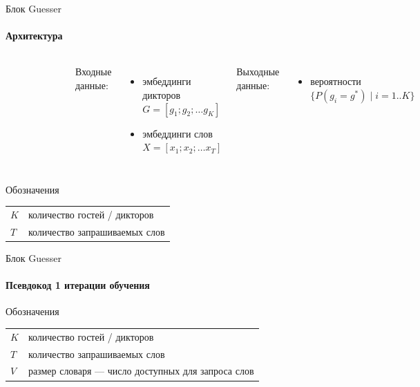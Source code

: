\documentclass[aspectratio=169]{beamer}
\begin{document}
\begin{frame}{Блок Guesser}
\framesubtitle{Архитектура}
    \begin{columns}
    
    \begin{figure}[bht]
    \includegraphics[width=.8\textwidth]{guesser.png}
    \end{figure}

    Входные данные:
    \begin{itemize}
        \item эмбеддинги дикторов\\
            $G = [g_1; g_2; \ldots g_K]$
        \item эмбеддинги слов\\
            $X = [x_1; x_2; \ldots x_T]$
    \end{itemize}
    Выходные данные:
    \begin{itemize}
        \item вероятности
            $\{P(g_i = g^*) \;|\; i=1..K\}$
    \end{itemize}
    \end{columns}

    \begin{block}{Обозначения}
    \begin{tabular}{l l}
        $K$ & количество гостей / дикторов\\
        $T$ & количество запрашиваемых слов
    \end{tabular}
    \end{block}
\end{frame}

\begin{frame}[fragile]{Блок Guesser}
\framesubtitle{Псевдокод 1 итерации обучения}

    \begin{block}{Обозначения}
    \begin{tabular}{l l}
        $K$ & количество гостей / дикторов\\
        $T$ & количество запрашиваемых слов\\
        $V$ & размер словаря --- число доступных для запроса слов
    \end{tabular}
    \end{block}
\end{frame}
\end{document}
